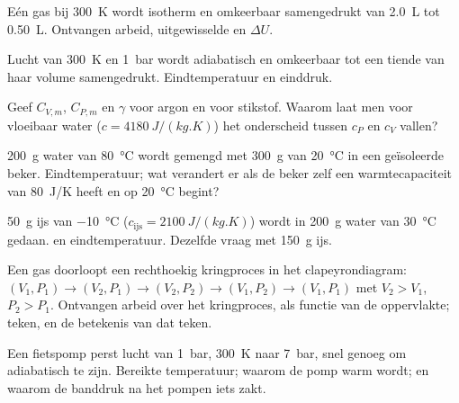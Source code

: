 \begin{exercise}[$\star$]\label{exo:b1:first-law:2}
Eén  gas bij \qty{300}{K} wordt isotherm en omkeerbaar samengedrukt
van \qty{2.0}{L} tot \qty{0.50}{L}. Ontvangen arbeid, uitgewisselde 
en $\Delta U$.
\end{exercise}

\begin{exercise}[$\star$]\label{exo:b1:first-law:3}
Lucht van \qty{300}{K} en \qty{1}{bar} wordt adiabatisch en omkeerbaar
tot een tiende van haar volume samengedrukt. Eindtemperatuur en einddruk.
\end{exercise}

\begin{exercise}[$\star$]\label{exo:b1:first-law:4}
Geef $C_{V,m}$, $C_{P,m}$ en $\gamma$ voor argon en voor stikstof. Waarom laat
men voor vloeibaar water ($c = \qty{4180}{J/(kg.K)}$) het onderscheid tussen
$c_P$ en $c_V$ vallen?
\end{exercise}

\begin{exercise}[$\star\star$]\label{exo:b1:first-law:5}
\qty{200}{g} water van \qty{80}{\degreeCelsius} wordt gemengd met \qty{300}{g}
van \qty{20}{\degreeCelsius} in een geïsoleerde beker. Eindtemperatuur; wat
verandert er als de beker zelf een warmtecapaciteit van \qty{80}{J/K} heeft en op
\qty{20}{\degreeCelsius} begint?
\end{exercise}

\begin{exercise}[$\star\star$]\label{exo:b1:first-law:6}
\qty{50}{g} ijs van \qty{-10}{\degreeCelsius} ($c_{\text{ijs}} = \qty{2100}{J/(kg.K)}$)
wordt in \qty{200}{g} water van \qty{30}{\degreeCelsius} gedaan. 
en eindtemperatuur. Dezelfde vraag met \qty{150}{g} ijs.
\end{exercise}

\begin{exercise}[$\star\star$]\label{exo:b1:first-law:7}
Een gas doorloopt een rechthoekig kringproces in het clapeyrondiagram: $(V_1, P_1)
\to (V_2, P_1) \to (V_2, P_2) \to (V_1, P_2) \to (V_1, P_1)$ met $V_2 > V_1$,
$P_2 > P_1$. Ontvangen arbeid over het kringproces, als functie van de oppervlakte;
teken, en de betekenis van dat teken.
\end{exercise}

\begin{exercise}[$\star\star$]\label{exo:b1:first-law:8}
Een fietspomp perst lucht van \qty{1}{bar}, \qty{300}{K} naar
\qty{7}{bar}, snel genoeg om adiabatisch te zijn. Bereikte temperatuur; waarom de
pomp warm wordt; en waarom de banddruk na het pompen iets
zakt.
\end{exercise}

